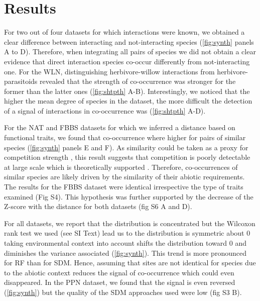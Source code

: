 \section{Results}\label{results}

For two out of four datasets for which interactions were known, we
obtained a clear difference between interacting and not-interacting
species (\ref{fig:synth} panels A to D). Therefore, when integrating all
pairs of species we did not obtain a clear evidence that direct
interaction species co-occur differently from not-interacting one. For
the WLN, distinguishing herbivore-willow interactions from
herbivore-parasitoids revealed that the strength of co-occurrence was
stronger for the former than the latter ones (\ref{fig:shtpth} A-B).
Interestingly, we noticed that the higher the mean degree of species in
the dataset, the more difficult the detection of a signal of
interactions in co-occurrence was (\ref{fig:shtpth} A-D).

For the NAT and FBBS datasets for which we inferred a distance based on
functional traits, we found that co-occurrence where higher for pairs of
similar species (\ref{fig:synth} panels E and F). As similarity could be
taken as a proxy for competition strength \citep{Morales-Castilla2015},
this result suggests that competition is poorly detectable at large
scale which is theoretically supported \citep{Araujo2014}. Therefore,
co-occurrences of similar species are likely driven by the similarity of
their abiotic requirements. The results for the FBBS dataset were
identical irrespective the type of traits examined (Fig S4). This
hypothesis was further supported by the decrease of the Z-score with the
distance for both datasets (fig S6 A and D).

For all datasets, we report that the distribution is concentrated but
the Wilcoxon rank test we used (see SI Text) lead us to the distribution
is symmetric about 0 taking environmental context into account shifts
the distribution toward 0 and diminishes the variance associated
(\ref{fig:synth}). This trend is more pronounced for RF than for SDM.
Hence, assuming that sites are not identical for species due to the
abiotic context reduces the signal of co-occurrence which could even
disappeared. In the PPN dataset, we found that the signal is even
reversed (\ref{fig:synth}) but the quality of the SDM approaches used
were low (fig S3 B).

